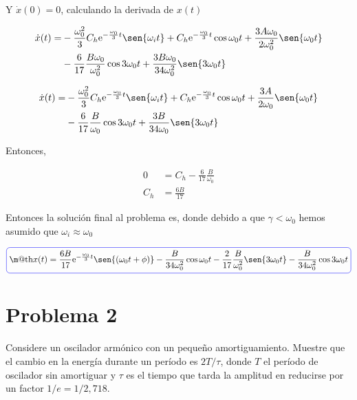 \documentclass[a4paper,10pt]{article}
\makeatletter
\numberwithin{equation}{section}
\newcommand*{\boxcolor}{blue}
\renewcommand{\boxed}[1]{\textcolor{\boxcolor}{%
\tikz[baseline={([yshift=-1ex]current bounding box.center)}] \node [rectangle, minimum width=1ex,rounded corners,draw] {\normalcolor\m@th$\displaystyle#1$};}}
\newcommand{\euler}{\mathrm{e}}
\makeatother
\begin{document}
Y $\dot{x}(0) = 0$, calculando la derivada de $x(t)$

\begin{align*}
 \dot{x}(t) =  &-\frac{\omega_0^2}{3} C_h \euler^{-\frac{\omega_0}{3} t} \sen{\omega_i t}
 + C_h \euler^{-\frac{\omega_0}{3} t} \cos{\omega_0t} + \frac{3A\omega_0}{2\omega_0^2} \sen{\omega_0t} \\ %
 &- \frac{6}{17}\frac{B\omega_0}{\omega_0^2} \cos{3\omega_0t} + \frac{3B\omega_0}{34\omega_0^2} \sen{3\omega_0t}
\end{align*}

\begin{align*}
 \dot{x}(t) = &- \frac{\omega_0^2}{3} C_h \euler^{-\frac{\omega_0}{3} t} \sen{\omega_i t}
 + C_h \euler^{-\frac{\omega_0}{3} t} \cos{\omega_0t} + \frac{3A}{2\omega_0} \sen{\omega_0t} \\ %
 &- \frac{6}{17}\frac{B}{\omega_0} \cos{3\omega_0t} + \frac{3B}{34\omega_0} \sen{3\omega_0t}
\end{align*}

Entonces,

\begin{align*}
0 &= C_h - \frac{6}{17}\frac{B}{\omega_0} \\
%
C_h &= \frac{6B}{17}
%
\end{align*}

Entonces la solución final al problema es, donde debido a que $\gamma < \omega_0$ hemos asumido que $\omega_i \approx \omega_0$

\begin{align*}
 \boxed{x(t) = \frac{6B}{17} \euler^{-\frac{\omega_0}{3} t} \sen{(\omega_0 t + \phi)}
 - \frac{B}{34\omega_0^2} \cos{\omega_0t} - \frac{2}{17}\frac{B}{\omega_0^2} \sen{3\omega_0t} - \frac{B}{34\omega_0^2} \cos{3\omega_0t}}
\end{align*}



\vspace{.3cm}

\section{Problema 2}

Considere un oscilador armónico con un pequeño amortiguamiento.
Muestre que el cambio en la energía durante un período es $2T/\tau$,
donde $T$ el período de oscilador sin amortiguar y $\tau$ es el tiempo
que tarda la amplitud en reducirse por un factor $1/e=1/2,718$.

\vspace{.3cm}
\end{document}
